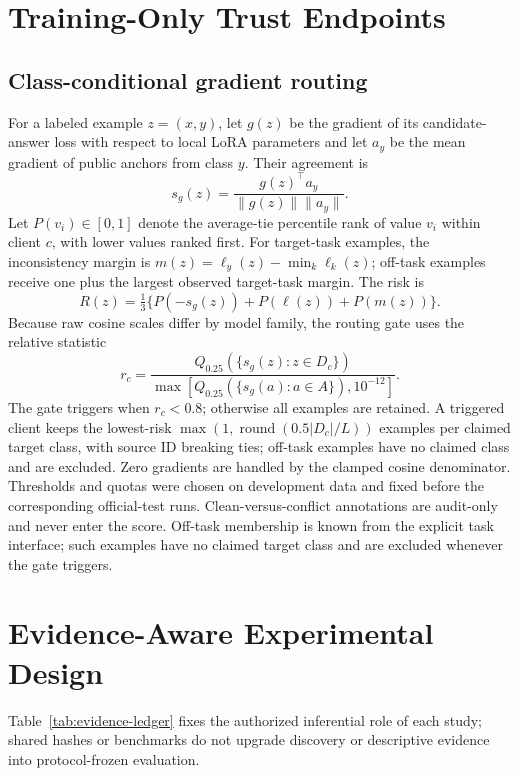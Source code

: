 \documentclass[letterpaper]{article}
\begin{document}
\section{Training-Only Trust Endpoints}
\subsection{Class-conditional gradient routing}
For a labeled example \(z=(x,y)\), let \(g(z)\) be the gradient of its
candidate-answer loss with respect to local LoRA parameters and let \(a_y\) be the mean
gradient of public anchors from class \(y\).  Their agreement is
\[
s_g(z)=\frac{g(z)^\top a_y}{\lVert g(z)\rVert\lVert a_y\rVert}.
\]
Let \(P(v_i)\in[0,1]\) denote the average-tie percentile rank of value \(v_i\)
within client \(c\), with lower values ranked first.  For target-task examples,
the inconsistency margin is \(m(z)=\ell_y(z)-\min_k\ell_k(z)\); off-task
examples receive one plus the largest observed target-task margin.  The risk is
\[
R(z)=\tfrac13\{P(-s_g(z))+P(\ell(z))+P(m(z))\}.
\]
Because raw cosine scales differ by model family, the routing gate uses the relative statistic
\[
r_c=\frac{Q_{0.25}(\{s_g(z):z\in D_c\})}
          {\max[Q_{0.25}(\{s_g(a):a\in A\}),10^{-12}]}.
\]
The gate triggers when \(r_c<0.8\); otherwise all examples are retained.  A
triggered client keeps the lowest-risk
\(\max(1,\operatorname{round}(0.5|D_c|/L))\) examples per claimed target
class, with source ID breaking ties; off-task examples have no claimed class
and are excluded.  Zero gradients are handled by the clamped cosine
denominator.  Thresholds and quotas were chosen on development data and fixed
before the corresponding official-test runs.  Clean-versus-conflict annotations
are audit-only and never enter the score.  Off-task membership is known from
the explicit task interface; such examples have no claimed target class and
are excluded whenever the gate triggers.

\section{Evidence-Aware Experimental Design}

Table~\ref{tab:evidence-ledger} fixes the authorized inferential role of each
study; shared hashes or benchmarks do not upgrade discovery or descriptive
evidence into protocol-frozen evaluation.
\end{document}
